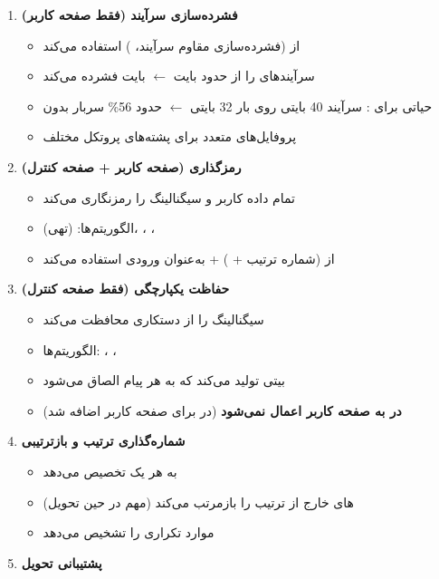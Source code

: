 \begin{enumerate}
\def\labelenumi{\arabic{enumi}.}
\tightlist
\item
  \textbf{فشرده‌سازی سرآیند (فقط صفحه کاربر)}

  \begin{itemize}
  \tightlist
  \item
    از  (فشرده‌سازی مقاوم سرآیند، ) استفاده می‌کند
  \item
    سرآیندهای  را از حدود  بایت \ensuremath{\leftarrow}  بایت فشرده می‌کند
  \item
    حیاتی برای : سرآیند 40 بایتی روی بار 32 بایتی \ensuremath{\leftarrow} حدود 56\% سربار بدون 
  \item
    پروفایل‌های متعدد  برای پشته‌های پروتکل مختلف
  \end{itemize}
\item
  \textbf{رمزگذاری (صفحه کاربر + صفحه کنترل)}

  \begin{itemize}
  \tightlist
  \item
    تمام داده کاربر و سیگنالینگ را رمزنگاری می‌کند
  \item
    الگوریتم‌ها:  (تهی)، ، ، 
  \item
    از  (شماره ترتیب + ) +  به‌عنوان ورودی استفاده می‌کند
  \end{itemize}
\item
  \textbf{حفاظت یکپارچگی (فقط صفحه کنترل)}

  \begin{itemize}
  \tightlist
  \item
    سیگنالینگ  را از دستکاری محافظت می‌کند
  \item
    الگوریتم‌ها: ، ، 
  \item
     بیتی تولید می‌کند که به هر پیام  الصاق می‌شود
  \item
    \textbf{در  به صفحه کاربر اعمال نمی‌شود} (در  برای صفحه کاربر اضافه شد)
  \end{itemize}
\item
  \textbf{شماره‌گذاری ترتیب و بازترتیبی}

  \begin{itemize}
  \tightlist
  \item
    به هر  یک  تخصیص می‌دهد
  \item
    های خارج از ترتیب را بازمرتب می‌کند (مهم در حین تحویل)
  \item
    موارد تکراری را تشخیص می‌دهد
  \end{itemize}
\item
  \textbf{پشتیبانی تحویل}


\end{enumerate}
